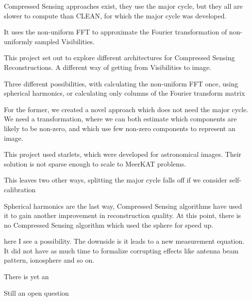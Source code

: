  Compressed Sensing approaches exist, they use the major cycle, but they all are slower to compute than CLEAN, for which the major cycle was developed. 

It uses the non-uniform FFT to approximate the Fourier transformation of non-uniformly sampled Visibilities.

This project set out to explore different architectures for Compressed Sensing Reconstructions. A different way of getting from Visibilities to image. 

Three different possibilities, with calculating the non-uniform FFT once, using spherical harmonics, or calculating only columns of the Fourier transform matrix

For the former, we created a novel approach which does not need the major cycle. We need a transformation, where we can both estimate which components are likely to be non-zero, and which use few non-zero components to represent an image.

This project used starlets, which were developed for astronomical images. Their solution is not sparse enough to scale to MeerKAT problems.

This leaves two other ways, splitting the major cycle falls off if we consider self-calibration



Spherical harmonics are the last way,
Compressed Sensing algorithms have used it to gain another improvement in reconstruction quality. At this point, there is no Compressed Sensing algorithm which used the sphere for speed up.

here I see a possibility. The downside is it leads to a new measurement equation. It did not have as much time to formalize corrupting effects like antenna beam pattern, ionosphere and so on.

There is yet an



 
Still an open question








